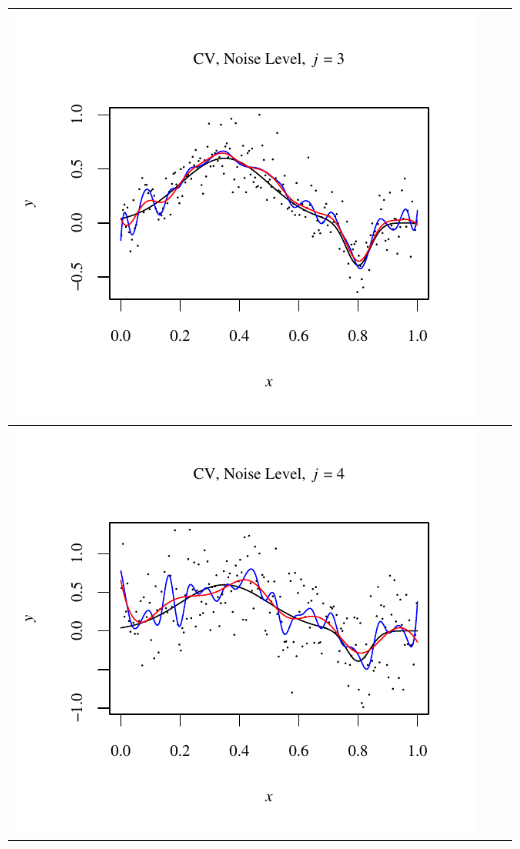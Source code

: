 \documentclass[11pt]{article}
\begin{document}
\begin{table}[h]
\begin{center}
\begin{tabular}{| >{\centering\arraybackslash}m{2.1in} |  >{\centering\arraybackslash}m{2.1in} |  >{\centering\arraybackslash}m{2.1in}|}
      \includegraphics[width=1\linewidth,height=0.18\textheight]{Graphs/1/1/assignment5_a_1_1_3}\\\hline
      \includegraphics[width=1\linewidth,height=0.18\textheight]{Graphs/1/1/assignment5_a_1_1_4}&

\end{tabular}
\end{center}
\end{table}
\end{document}
